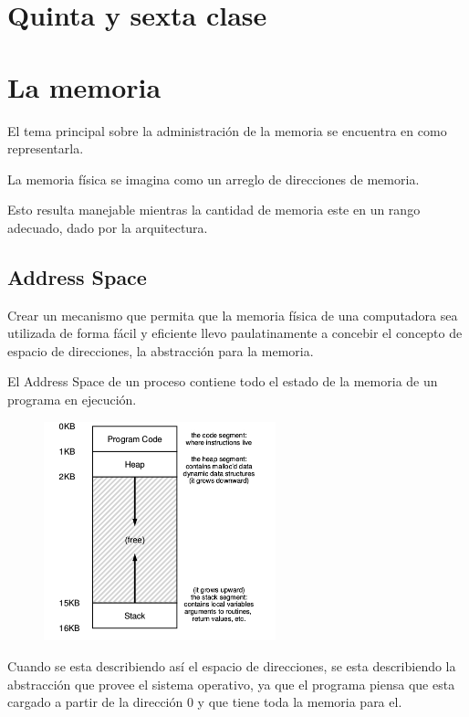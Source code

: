 \documentclass[titlepage,a4paper]{article}
\begin{document}


\section*{Quinta y sexta clase}
\section{La memoria}
El  tema principal sobre la administración de la memoria se encuentra en como representarla.

La memoria física se imagina como un arreglo de direcciones de memoria.

Esto resulta manejable mientras la cantidad de memoria este en un rango adecuado, dado por la arquitectura.

\subsection*{Address Space}
Crear un mecanismo que permita que la memoria física de una computadora sea utilizada de forma fácil y eficiente llevo paulatinamente a concebir el concepto de espacio de direcciones, la abstracción para la memoria.

El Address Space de un proceso contiene todo el estado de la memoria de un programa en ejecución.

\begin{figure}[!htb]
    \centering
    \includegraphics[width=0.6\textwidth]{ImagenesApunte/address_space.jpg}
\end{figure}

Cuando se esta describiendo así el espacio de direcciones, se esta describiendo la abstracción que provee el sistema operativo, ya que el programa piensa que esta cargado a partir de la dirección 0 y que tiene toda la memoria para el.
\end{document}
